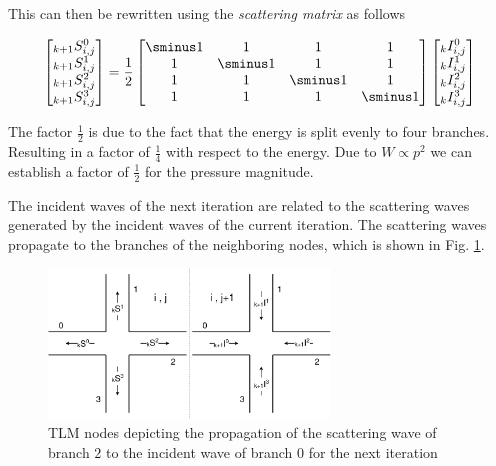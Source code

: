 \documentclass[twocolumn]{article}
\begin{document}
This can then be rewritten using the \textit{scattering matrix} as follows

\begin{equation}
\begin{bmatrix}
    _{k+1}S_{i,j}^{0} \\
    _{k+1}S_{i,j}^{1} \\
    _{k+1}S_{i,j}^{2} \\
    _{k+1}S_{i,j}^{3} \\
\end{bmatrix}
=
\frac{1}{2}
\begin{bmatrix}
    \sminus1 & 1 & 1 & 1 \\
    1 & \sminus1 & 1 & 1 \\
    1 & 1 & \sminus1 & 1 \\
    1 & 1 & 1 & \sminus1 \\
\end{bmatrix}
\begin{bmatrix}
    _kI_{i,j}^{0} \\
    _kI_{i,j}^{1} \\
    _kI_{i,j}^{2} \\
    _kI_{i,j}^{3} \\
\end{bmatrix}
\label{eq_scattering_matrix}
\end{equation}

The factor $\frac{1}{2}$ is due to the fact that the energy is split evenly to four branches.
Resulting in a factor of $\frac{1}{4}$ with respect to the energy.
Due to $W \propto p^{2}$ we can establish a factor of $\frac{1}{2}$ for the
pressure magnitude.

The incident waves of the next iteration are related to the scattering waves generated by the
incident waves of the current iteration.
The scattering waves propagate to the branches of the neighboring nodes, which is shown in
Fig. \ref{fig_tlm_nodes_transmission}.

\begin{figure}[H]
    \centering
    \includegraphics[width=75mm]{./Images/tlm_nodes_transmission.png}
    \caption{TLM nodes depicting the propagation of the scattering wave of branch $2$ to the incident wave of branch $0$ for the next iteration}
    \label{fig_tlm_nodes_transmission}
\end{figure}
\end{document}
